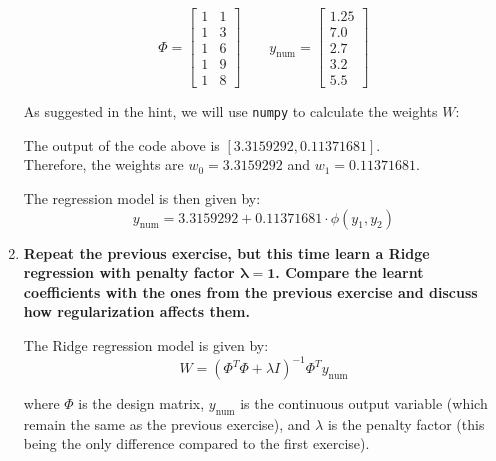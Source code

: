 \documentclass[12pt]{article}
\begin{document}
\begin{enumerate}
    \begin{equation*}
        \Phi = \begin{bmatrix}
            1 & 1 \\
            1 & 3 \\
            1 & 6 \\
            1 & 9 \\
            1 & 8
        \end{bmatrix} \qquad
        y_\text{num} = \begin{bmatrix}
            1.25 \\
            7.0 \\
            2.7 \\
            3.2 \\
            5.5
        \end{bmatrix}
    \end{equation*}

    As suggested in the hint, we will use \texttt{numpy} to calculate the weights $W$:

    \vspace{10pt}
    

    \vspace{10pt}
    The output of the code above is $[3.3159292,  0.11371681]$.\\ 
    Therefore, the weights are $w_0 = 3.3159292$ and $w_1 = 0.11371681$.

    \vspace{10pt}
    The regression model is then given by:
    \begin{equation*}
        y_\text{num} = 3.3159292 + 0.11371681 \cdot \phi(y_1, y_2)
    \end{equation*}

    \item \textbf{Repeat the previous exercise, but this time learn a Ridge regression with penalty
    factor $\mathbf{\lambda = 1}$. Compare the learnt coeﬃcients with the ones from the previous exercise and
    discuss how regularization aﬀects them.}

    \vspace{10pt}
    The Ridge regression model is given by:
    \begin{equation*}
        W = (\Phi^T \Phi + \lambda I)^{-1} \Phi^T y_\text{num}
    \end{equation*}
    
    where $\Phi$ is the design matrix, $y_\text{num}$ is the continuous output variable (which remain the same as the previous exercise), and $\lambda$ is the penalty factor (this being the only difference compared to the first exercise).


\end{enumerate}
\end{document}
